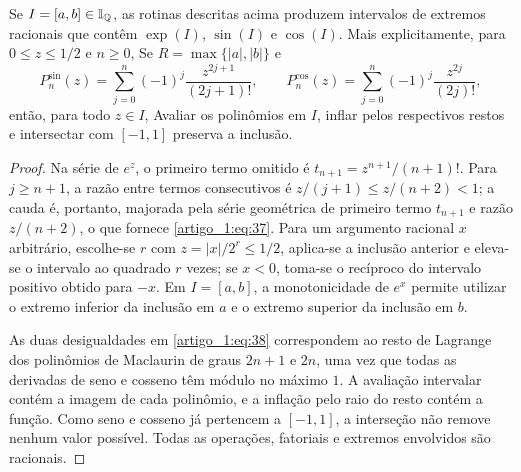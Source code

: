 \begin{lema}\label{map:artigo_1:6.1}
Se $I=[a,b]\in\mathbb I_{\mathbb Q}$, as rotinas descritas acima produzem intervalos de extremos racionais que contêm $\exp(I)$, $\sin(I)$ e $\cos(I)$. Mais explicitamente, para $0\le z\le1/2$ e $n\ge0$,
Se $R=\max\{|a|,|b|\}$ e
\[
P_n^{\sin}(z)=\sum_{j=0}^n(-1)^j\frac{z^{2j+1}}{(2j+1)!},\qquad
P_n^{\cos}(z)=\sum_{j=0}^n(-1)^j\frac{z^{2j}}{(2j)!},
\]
então, para todo $z\in I$,
Avaliar os polinômios em $I$, inflar pelos respectivos restos e intersectar com $[-1,1]$ preserva a inclusão.
\end{lema}
\begin{proof}
Na série de $e^z$, o primeiro termo omitido é $t_{n+1}=z^{n+1}/(n+1)!$. Para $j\ge n+1$, a razão entre termos consecutivos é $z/(j+1)\le z/(n+2)<1$; a cauda é, portanto, majorada pela série geométrica de primeiro termo $t_{n+1}$ e razão $z/(n+2)$, o que fornece \eqref{artigo_1:eq:37}. Para um argumento racional $x$ arbitrário, escolhe-se $r$ com $z=|x|/2^r\le1/2$, aplica-se a inclusão anterior e eleva-se o intervalo ao quadrado $r$ vezes; se $x<0$, toma-se o recíproco do intervalo positivo obtido para $-x$. Em $I=[a,b]$, a monotonicidade de $e^x$ permite utilizar o extremo inferior da inclusão em $a$ e o extremo superior da inclusão em $b$.

As duas desigualdades em \eqref{artigo_1:eq:38} correspondem ao resto de Lagrange dos polinômios de Maclaurin de graus $2n+1$ e $2n$, uma vez que todas as derivadas de seno e cosseno têm módulo no máximo $1$. A avaliação intervalar contém a imagem de cada polinômio, e a inflação pelo raio do resto contém a função. Como seno e cosseno já pertencem a $[-1,1]$, a interseção não remove nenhum valor possível. Todas as operações, fatoriais e extremos envolvidos são racionais.
\end{proof}

